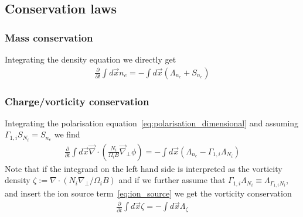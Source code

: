 \subsection{Conservation laws} \label{sec:conservation}
\subsubsection{Mass conservation}
Integrating the density equation we directly get
\begin{align} \label{eq:mass_conservation}
  \frac{\partial}{\partial t} \int d\vec{x} n_e =  - \int d\vec{x} (\Lambda_{n_e}+S_{n_e})
\end{align}
\subsubsection{Charge/vorticity conservation}
Integrating the polarisation equation~\eqref{eq:polarisation_dimensional}
and assuming $\Gamma_{1,i}S_{N_i} = S_{n_e}$ we find
\begin{align} \label{eq:charge_conservation}
  \frac{\partial}{\partial t} \int d\vec{x} \vec{\nabla} \cdot\left(\frac{N_i}{\Omega_i B} \vec{\nabla}_\perp \phi\right) =  - \int d\vec{x} (\Lambda_{n_e} - \Gamma_{1,i}\Lambda_{N_i})
\end{align}
Note that if the integrand on the left hand side is interpreted as the \ExB vorticity
density
$\zeta := \nabla\cdot( N_i\nabla_\perp/\Omega_i B)$
and if we further assume that $\Gamma_{1,i} \Lambda_{N_i} \equiv \Lambda_{\Gamma_{1,i}N_i}$, and insert the ion source term~\eqref{eq:ion_source}
we get the vorticity conservation
\begin{align} \label{eq:vorticity_conservation}
  \frac{\partial}{\partial t} \int d\vec{x} \zeta =  - \int d\vec{x}\Lambda_{\zeta}
\end{align}

